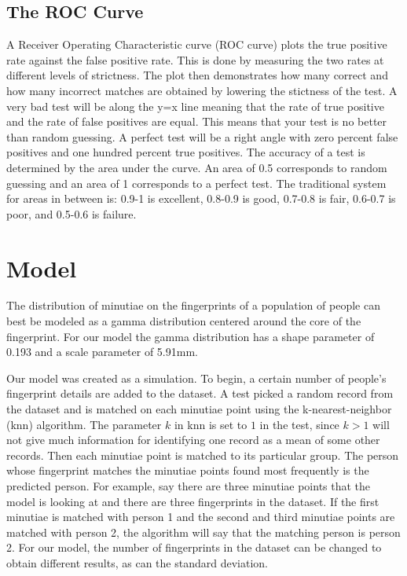\documentclass[a4paper]{article}
\begin{document}
\subsection{The ROC Curve}
A Receiver Operating Characteristic curve (ROC curve) plots the true positive rate against the false positive rate. This is done by measuring the two rates at different levels of strictness. The plot then demonstrates how many correct and how many incorrect matches are obtained by lowering the stictness of the test. A very bad test will be along the y=x line meaning that the rate of true positive and the rate of false positives are equal. This means that your test is no better than random guessing. A perfect test will be a right angle with zero percent false positives and one hundred percent true positives. The accuracy of a test is determined by the area under the curve. An area of 0.5 corresponds to random guessing and an area of 1 corresponds to a perfect test. The traditional system for areas in between is: 0.9-1 is excellent, 0.8-0.9 is good, 0.7-0.8 is fair, 0.6-0.7 is poor, and 0.5-0.6 is failure. \cite{ROCnotes}

\section{Model}

The distribution of minutiae on the fingerprints of a population of people can best be modeled as a gamma distribution centered around the core of the fingerprint. For our model the gamma distribution has a shape parameter of 0.193 and a scale parameter of 5.91mm.

Our model was created as a simulation. To begin, a certain number of people's fingerprint details are added to the dataset. A test picked a random record from the dataset and is matched on each minutiae point using the k-nearest-neighbor (knn) algorithm. The parameter $k$ in knn is set to $1$ in the test, since $k > 1$ will not give much information for identifying one record as a mean of some other records. Then each minutiae point is matched to its particular group. The person whose fingerprint matches the minutiae points found most frequently is the predicted person.   For example, say there are three minutiae points that the model is looking at and there are three fingerprints in the dataset. If the first minutiae is matched with person 1 and the second and third minutiae points are matched with person 2, the algorithm will say that the matching person is person 2. For our model, the number of fingerprints in the dataset can be changed to obtain different results, as can the standard deviation.
\end{document}
